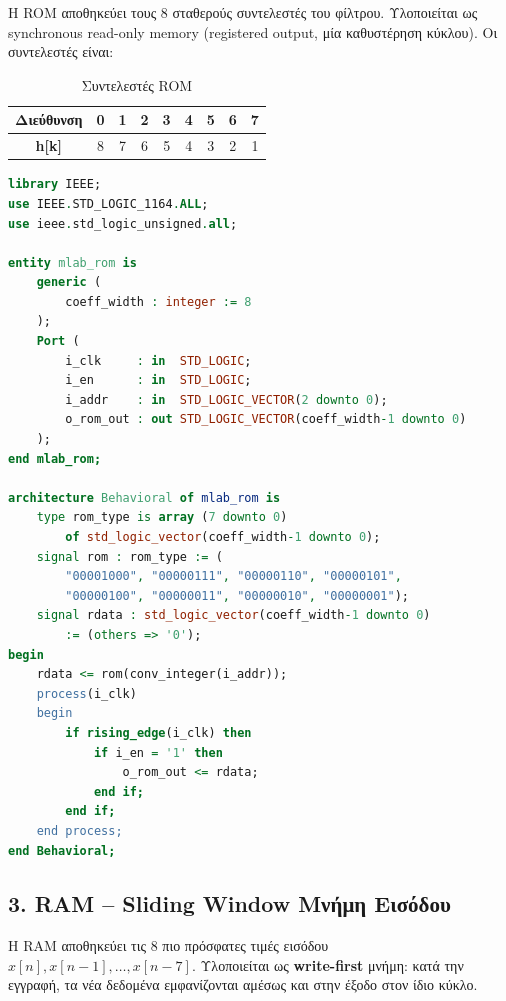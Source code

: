 \documentclass[12pt]{article}
\begin{document}
Η ROM αποθηκεύει τους 8 σταθερούς συντελεστές του φίλτρου. Υλοποιείται ως synchronous read-only memory (registered output, μία καθυστέρηση κύκλου). Οι συντελεστές είναι:

\begin{table}[H]
    \centering
    \begin{tabular}{|c|c|c|c|c|c|c|c|c|}
        \hline
        \textbf{Διεύθυνση} & 0 & 1 & 2 & 3 & 4 & 5 & 6 & 7 \\
        \hline
        \textbf{h[k]} & 8 & 7 & 6 & 5 & 4 & 3 & 2 & 1 \\
        \hline
    \end{tabular}
    \caption{Συντελεστές ROM}
\end{table}

\begin{lstlisting}[language=VHDL]
library IEEE;
use IEEE.STD_LOGIC_1164.ALL;
use ieee.std_logic_unsigned.all;

entity mlab_rom is
    generic (
        coeff_width : integer := 8
    );
    Port (
        i_clk     : in  STD_LOGIC;
        i_en      : in  STD_LOGIC;
        i_addr    : in  STD_LOGIC_VECTOR(2 downto 0);
        o_rom_out : out STD_LOGIC_VECTOR(coeff_width-1 downto 0)
    );
end mlab_rom;

architecture Behavioral of mlab_rom is
    type rom_type is array (7 downto 0)
        of std_logic_vector(coeff_width-1 downto 0);
    signal rom : rom_type := (
        "00001000", "00000111", "00000110", "00000101",
        "00000100", "00000011", "00000010", "00000001");
    signal rdata : std_logic_vector(coeff_width-1 downto 0)
        := (others => '0');
begin
    rdata <= rom(conv_integer(i_addr));
    process(i_clk)
    begin
        if rising_edge(i_clk) then
            if i_en = '1' then
                o_rom_out <= rdata;
            end if;
        end if;
    end process;
end Behavioral;
\end{lstlisting}

\subsection*{3. RAM -- Sliding Window Μνήμη Εισόδου}

Η RAM αποθηκεύει τις 8 πιο πρόσφατες τιμές εισόδου $x[n], x[n-1], \ldots, x[n-7]$. Υλοποιείται ως \textbf{write-first} μνήμη: κατά την εγγραφή, τα νέα δεδομένα εμφανίζονται αμέσως και στην έξοδο στον ίδιο κύκλο.
\end{document}
